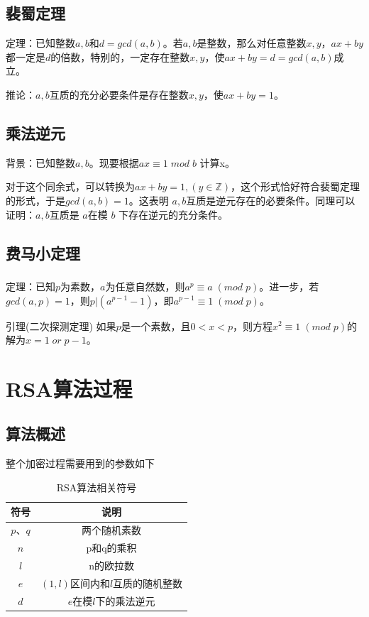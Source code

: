 \documentclass[UTF8,a4paper,11pt]{ctexart}
\newcommand{\wuhao}{\fontsize{10.5pt}{10.5pt}\selectfont}
\newcommand{\upcite}[1]{\textsuperscript{\textsuperscript{\cite{#1}}}}
\begin{document}
\subsection{裴蜀定理}
	\par 定理：已知整数$a,b$和$d=gcd(a,b)$。若$a,b$是整数，那么对任意整数$x,y$，$ax+by$ 都一定是$d$的倍数，特别的，一定存在整数$x,y$，使$ax+by=d=gcd(a,b)$成立。
	\par 推论：$a,b$互质的充分必要条件是存在整数$x,y$，使$ax+by=1$。

\subsection{乘法逆元}
	\par 背景：已知整数$a,b$。现要根据$ax\equiv1\; mod \; b$ 计算x。
	\par 对于这个同余式，可以转换为$ax+by=1,(y\in \mathbb{Z})$，这个形式恰好符合裴蜀定理的形式，于是$gcd(a,b)=1$。这表明 $a,b$互质是逆元存在的必要条件。同理可以证明：$a,b$互质是 $a$在模 $b$ 下存在逆元的充分条件。

\subsection{费马小定理}
	\par 定理\upcite{1}：已知$p$为素数，$a$为任意自然数，则$a^{p}\equiv a\;(mod\; p)$。进一步，若$gcd(a,p)=1$，则$p|(a^{p-1}-1)$，即$a^{p-1}\equiv 1\; (mod \; p)$。
	\par 引理(二次探测定理)  如果$p$是一个素数，且$0<x<p$，则方程$x^2\equiv1 \; (mod\; p)$的解为$x=1 \; or \; p-1$。



\section{RSA算法过程}

\subsection{算法概述}
	\par 整个加密过程需要用到的参数如下

		\begin{table}[H] \wuhao             %
		   \centering
		  \caption{RSA算法相关符号}\label{tab}
		  \begin{tabular}{c|c}
		    \toprule                  %
		    符号 & 说明 \\
		    \hline                  %
		    ${{p}\mbox{、}{q}}$ & 两个随机素数 \\
		    $n$ & p和q的乘积 \\
		    $l$ & n的欧拉数 \\
		    $e$ & $(1,l)$区间内和$l$互质的随机整数 \\
			$d$ & $e$在模$l$下的乘法逆元\\
		\bottomrule                %
		  \end{tabular}
		\end{table}
\end{document}
